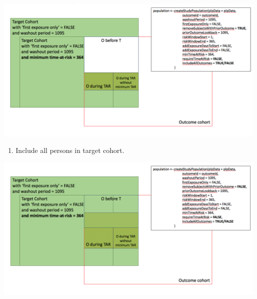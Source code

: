 \documentclass[]{book}
\providecommand{\tightlist}{%
  \setlength{\itemsep}{0pt}\setlength{\parskip}{0pt}}
\begin{document}
\includegraphics{images/PatientLevelPrediction/popdef5.png}

\begin{enumerate}
\def\labelenumi{\arabic{enumi}.}
\setcounter{enumi}{5}
\tightlist
\item
  Include all persons in target cohort.
\end{enumerate}

\includegraphics{images/PatientLevelPrediction/popdef6.png}


\end{document}
